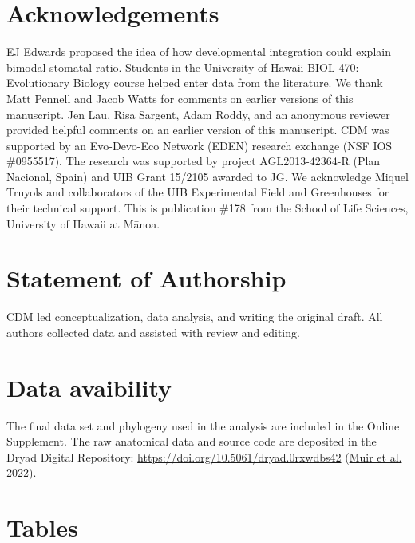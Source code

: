 \documentclass[
  12pt,
]{article}
\begin{document}
\hypertarget{acknowledgements}{%
\section{Acknowledgements}\label{acknowledgements}}

EJ Edwards proposed the idea of how developmental integration could explain bimodal stomatal ratio. Students in the University of Hawaii BIOL 470: Evolutionary Biology course helped enter data from the literature. We thank Matt Pennell and Jacob Watts for comments on earlier versions of this manuscript. Jen Lau, Risa Sargent, Adam Roddy, and an anonymous reviewer provided helpful comments on an earlier version of this manuscript. CDM was supported by an Evo-Devo-Eco Network (EDEN) research exchange (NSF IOS \#0955517). The research was supported by project AGL2013-42364-R (Plan Nacional, Spain) and UIB Grant 15/2105 awarded to JG. We acknowledge Miquel Truyols and collaborators of the UIB Experimental Field and Greenhouses for their technical support. This is publication \#178 from the School of Life Sciences, University of Hawaii at Mānoa.

\hypertarget{statement-of-authorship}{%
\section{Statement of Authorship}\label{statement-of-authorship}}

CDM led conceptualization, data analysis, and writing the original draft. All authors collected data and assisted with review and editing.

\hypertarget{data-avaibility}{%
\section{Data avaibility}\label{data-avaibility}}

The final data set and phylogeny used in the analysis are included in the Online Supplement. The raw anatomical data and source code are deposited in the Dryad Digital Repository: \url{https://doi.org/10.5061/dryad.0rxwdbs42} (\protect\hyperlink{ref-muir_data_2022}{Muir et al. 2022}).

\clearpage

\hypertarget{tables}{%
\section{Tables}\label{tables}}
\end{document}
